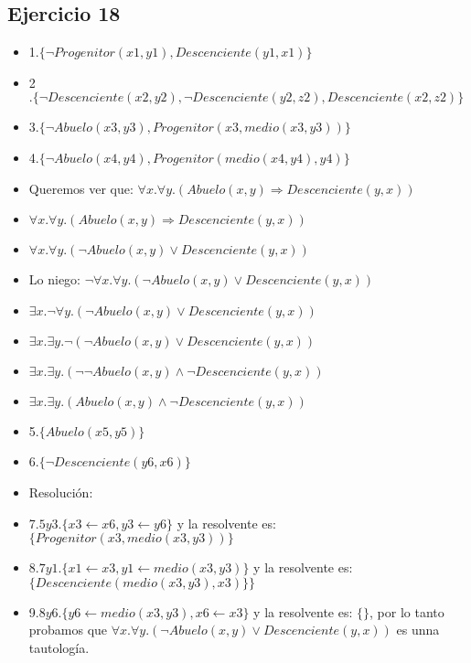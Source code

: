 \documentclass[10pt,a4paper]{article}
\begin{document}
  \subsection{Ejercicio 18}
\begin{itemize}
\item 1$.\{\neg Progenitor(x1,y1),Descenciente(y1,x1)\}$ 
\item 2$.\{\neg Descenciente(x2,y2), \neg Descenciente(y2,z2), Descenciente(x2,z2)\}$ 
\item 3$.\{\neg Abuelo(x3,y3), Progenitor(x3, medio(x3,y3))\}$ 
\item 4$.\{\neg Abuelo(x4,y4), Progenitor(medio(x4,y4),y4)\}$ 
\item Queremos ver que: $\forall x. \forall y. (Abuelo(x,y) \Rightarrow Descenciente(y,x))$ 
\item $\forall x. \forall y. (Abuelo(x,y) \Rightarrow Descenciente(y,x))$ 
\item $\forall x. \forall y. (\neg Abuelo(x,y) \vee Descenciente(y,x))$ 
\item Lo niego: $\neg \forall x. \forall y. (\neg Abuelo(x,y) \vee Descenciente(y,x))$ 
\item $\exists x. \neg \forall y. (\neg Abuelo(x,y) \vee Descenciente(y,x))$ 
\item $\exists x. \exists y. \neg (\neg Abuelo(x,y) \vee Descenciente(y,x))$ 
\item $\exists x. \exists y. (\neg \neg Abuelo(x,y) \wedge \neg Descenciente(y,x))$ 
\item $\exists x. \exists y. (Abuelo(x,y) \wedge \neg Descenciente(y,x))$ 
\item 5$.\{Abuelo(x5,y5)\} $  
\item 6$.\{\neg Descenciente(y6,x6)\} $ \\
\item Resolución: 
\item 7$. 5y3. \{x3 \leftarrow x6, y3 \leftarrow y6\}$ y la resolvente es: $\{Progenitor(x3, medio(x3,y3))\}$ 
\item 8$. 7y1. \{x1 \leftarrow x3, y1 \leftarrow medio(x3,y3)\}$ y la resolvente es: $\{Descenciente( medio(x3,y3),x3)\}\}$ 
\item 9.$ 8y6. \{y6 \leftarrow medio(x3,y3), x6 \leftarrow x3\}$ y la resolvente es: $\{\}$, por lo tanto probamos que $\forall x. \forall y. (\neg Abuelo(x,y) \vee Descenciente(y,x))$ es unna tautología.
\end{itemize}
\end{document}
